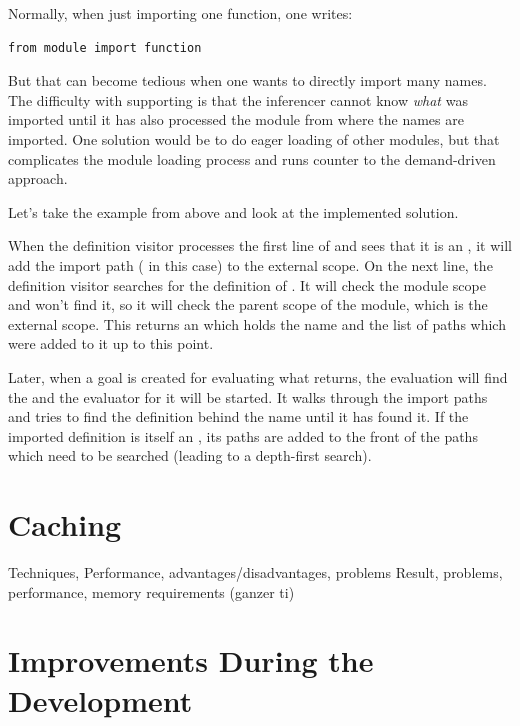 \documentclass[12pt,halfparskip,DIV11,BCOR10mm]{scrreprt}
\begin{document}
Normally, when just importing one function, one writes:

\begin{lstlisting}
from module import function
\end{lstlisting}

But that can become tedious when one wants to directly import many names. The difficulty with supporting  is that the inferencer cannot know \emph{what} was imported until it has also processed the module from where the names are imported. One solution would be to do eager loading of other modules, but that complicates the module loading process and runs counter to the demand-driven approach.

Let's take the example from above and look at the implemented solution.

When the definition visitor processes the first line of  and sees that it is an , it will add the import path ( in this case) to the external scope. On the next line, the definition visitor searches for the definition of . It will check the module scope and won't find it, so it will check the parent scope of the module, which is the external scope. This returns an  which holds the name and the list of  paths which were added to it up to this point.

Later, when a goal is created for evaluating what  returns, the evaluation will find the  and the evaluator for it will be started. It walks through the import paths and tries to find the definition behind the name  until it has found it. If the imported definition is itself an , its paths are added to the front of the paths which need to be searched (leading to a depth-first search).


\section{Caching}
 Techniques, Performance, advantages/disadvantages, problems
 Result, problems, performance, memory requirements (ganzer ti)


\section{Improvements During the Development}
\end{document}
